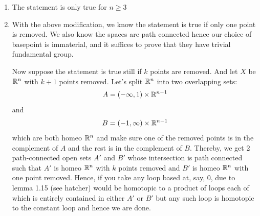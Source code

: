 \documentclass{pset}
\begin{document}
\maketitle

\pagebreak 

\begin{problem}
    \begin{enumerate}
        \item The statement is only true for $n \geq 3$
        \item With the above modification, we know the statement is true if only one point is removed. We also know the spaces are path connected hence our choice of basepoint is immaterial, and it suffices to prove that they have trivial fundamental group.
        
        Now suppose the statement is true still if $k$ points are removed. And let $X$ be $\mathbb{R}^n$ with $k+1$ points removed. Let's split $\mathbb{R}^n$ into two overlapping sets:
        \[A = (-\infty, 1)\times\mathbb{R}^{n-1}\]
        and
        \[B = (-1, \infty)\times\mathbb{R}^{n-1}\]
        which are both homeo $\mathbb{R}^n$ and make sure one of the removed points is in the complement of $A$ and the rest is in the complement of $B$. Thereby, we get 2 path-connected open sets $A'$ and $B'$ whose intersection is path connected such that $A'$ is homeo $\mathbb{R}^n$ with $k$ points removed and $B'$ is homeo $\mathbb{R}^n$ with one point removed. Hence, if you take any loop based at, say, $0$, due to lemma 1.15 (see hatcher) would be homotopic to a product of loops each of which is entirely contained in either $A'$ or $B'$ but any such loop is homotopic to the constant loop and hence we are done.
    \end{enumerate}
\end{problem}
\end{document}
